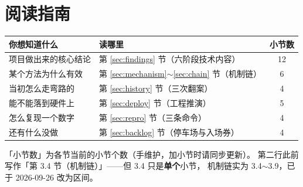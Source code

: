 \documentclass[11pt,a4paper]{ctexart}
\begin{document}
\begin{abstract}
架构端还有一个\textbf{不增加可训练参数、不增加额外训练成本}的变量：把 SimpleCNN 的最大池化层从 2 个增加到 5 个，参数量不变，但必须在设计阶段选定；同设置同种子下提高 \textbf{15.52 个百分点}（单 seed；3 seed 复核同向 +12.20，基线协议不同）。保护主要来自降维。

本报告同时记录一条方法学观察：本文发现一个同超参数、同随机种子、跨代码实现稳定的 \textbf{5.55 个百分点}差异——同一份权重在两条评估路径下读数逐位相同，而两套训练脚本产出的权重稳定分居两簇。这个差异经过三次干预实验仍未找到原因；在找到原因之前，\textbf{本文不跨代码实现引用精度数字}。这不排除“某一套代码里还有一个没找到的具体差别”，所以按“已知未知”记录，而不是上升成普遍规律。

\vspace{0.6em}
\noindent\textbf{关键词：} 存算一体；非线性失真；读出瓶颈；有效秩；鲁棒性杠杆；测量纪律；技术归档
\end{abstract}

\tableofcontents
\newpage

\section{阅读指南}

\begin{center}
\small
\begin{tabular}{llc}
\toprule
你想知道什么 & 读哪里 & 小节数 \\
\midrule
项目做出来的核心结论 & 第 \ref{sec:findings} 节（六阶段技术内容） & 12 \\
某个方法为什么有效 & 第 \ref{sec:mechanism}$\sim$\ref{sec:chain} 节（机制链） & 6 \\
当初怎么走弯路的 & 第 \ref{sec:history} 节（三次翻案） & 4 \\
能不能落到硬件上 & 第 \ref{sec:deploy} 节（工程推演） & 5 \\
怎么复现一个数字 & 第 \ref{sec:repro} 节（三条命令） & 4 \\
还有什么没做 & 第 \ref{sec:backlog} 节（停车场与入场券） & 4 \\
\bottomrule
\end{tabular}

\vspace{2pt}
\begin{minipage}{0.94\textwidth}
\footnotesize
「小节数」为各节当前的小节个数（手维护，加小节时请同步更新）。
第二行此前写作「第 3.4 节（机制链）」——但 3.4 只是\textbf{单个}小节，
机制链实为 3.4$\sim$3.9，已于 2026-09-26 改为区间。
\end{minipage}
\end{center}
\end{document}
